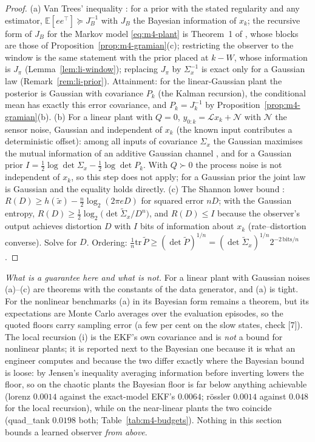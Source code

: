\begin{proof}
(a) Van Trees' inequality \citep[Ch.~2.4]{vantrees1968detection}: for a prior with the stated regularity and any
estimator, $\mathbb E[ee^\top]\succeq J_B^{-1}$ with $J_B$ the Bayesian information of $x_k$; the recursive form of
$J_B$ for the Markov model \eqref{eq:m4-plant} is Theorem~1 of \citet{tichavsky1998posterior}, whose blocks are
those of Proposition~\ref{prop:m4-gramian}(c); restricting the observer to the window is the same statement with
the prior placed at $k-W$, whose information is $J_\pi$ (Lemma~\ref{lem:li-window}); replacing $J_\pi$ by $\Sigma_x^{-1}$ is exact
only for a Gaussian law (Remark~\ref{rem:li-prior}). Attainment: for the linear-Gaussian plant the posterior is Gaussian with covariance
$P_k$ (the Kalman recursion), the conditional mean has exactly this error covariance, and $P_k=J_k^{-1}$ by
Proposition~\ref{prop:m4-gramian}(b). (b) For a linear plant with $Q=0$, $y_{0:k}=\mathcal L x_k+\mathcal N$ with $\mathcal N$ the sensor noise,
Gaussian and independent of $x_k$ (the known input contributes a deterministic offset): among all inputs of covariance
$\Sigma_x$ the Gaussian maximises the mutual information of an additive Gaussian channel
\citep[Ch.~8--9]{cover2006elements}, and for a Gaussian prior $I=\tfrac12\log\det\Sigma_x-\tfrac12\log\det P_k$. With
$Q\succ0$ the process noise is not independent of $x_k$, so this step does not apply; for a Gaussian prior the joint law
is Gaussian and the equality holds directly. (c) The Shannon lower bound \citep[Ch.~10]{cover2006elements}: $R(D)\ge h(\tilde x)-\tfrac n2\log_2(2\pi eD)$ for squared error $nD$; with the
Gaussian entropy, $R(D)\ge\tfrac12\log_2\big(\det\tilde\Sigma_x/D^n\big)$, and $R(D)\le I$ because the observer's
output achieves distortion $D$ with $I$ bits of information about $x_k$ (rate--distortion converse). Solve for
$D$. Ordering: $\tfrac1n\mathrm{tr}\,\tilde P\ge(\det\tilde P)^{1/n}=(\det\tilde\Sigma_x)^{1/n}2^{-2\,\mathrm{bits}/n}$.
\end{proof}
\noindent\emph{What is a guarantee here and what is not.} For a linear plant with Gaussian noises (a)--(c) are
theorems with the constants of the data generator, and (a) is tight. For the nonlinear benchmarks (a) in its
Bayesian form remains a theorem, but its expectations are Monte Carlo averages over the evaluation episodes, so
the quoted floors carry sampling error (a few per cent on the slow states, check [7]). The local recursion (i) is
the EKF's own covariance and is \emph{not} a bound for nonlinear plants; it is reported next to the Bayesian one
because it is what an engineer computes and because the two differ exactly where the Bayesian bound is loose: by
Jensen's inequality averaging information before inverting lowers the floor, so on the chaotic plants the Bayesian
floor is far below anything achievable (lorenz $0.0014$ against the exact-model EKF's $0.0064$; r\"ossler $0.0014$
against $0.048$ for the local recursion), while on the near-linear plants the two coincide (quad\_tank $0.0198$ both;
Table~\ref{tab:m4-budgets}). Nothing in this section bounds a learned observer \emph{from above}.

